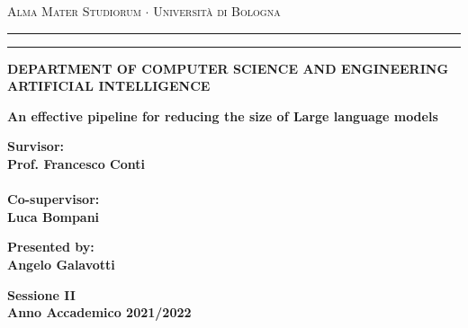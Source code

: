 \documentclass[12pt,a4paper,openright,twoside]{report}
\begin{document}
\begin{titlepage}
	\begin{center}
		{{\Large{\textsc{Alma Mater Studiorum $\cdot$ Università di
							Bologna}}}} \rule[0.1cm]{15.8cm}{0.1mm}
		\rule[0.5cm]{15.8cm}{0.6mm}
		{\small{\bf DEPARTMENT OF COMPUTER SCIENCE
		AND ENGINEERING\\
		ARTIFICIAL INTELLIGENCE }}
	\end{center}
	\vspace{15mm}
	\begin{center}
		{\LARGE{\bf An effective pipeline for reducing the size of Large language models}}\\
		\vspace{3mm}
	\end{center}
	\vspace{40mm}
	\par
	\noindent
	\begin{minipage}[t]{0.47\textwidth}
		{\large{\bf Survisor:\\
				Prof. Francesco Conti\\\\
				Co-supervisor:\\
				Luca Bompani}}
	\end{minipage}
	\hfill
	\begin{minipage}[t]{0.47\textwidth}\raggedleft
		{\large{\bf Presented by:\\
				Angelo Galavotti}}
	\end{minipage}
	\vspace{20mm}
	\begin{center}
		{\large{\bf Sessione II\\
				Anno Accademico 2021/2022}}
	\end{center}
\end{titlepage}
\end{document}
